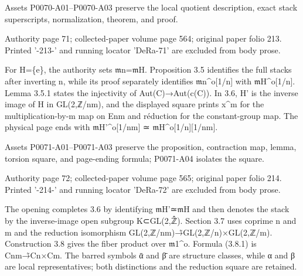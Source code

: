 \documentclass[11pt,a4paper]{article}
\begin{document}
Assets P0070-A01--P0070-A03 preserve the local quotient description, exact stack superscripts, normalization, theorem, and proof.


\par\medskip
\hypertarget{D018-P0071}{}
\par\smallskip
Authority page 71; collected-paper volume page 564; original paper folio 213. Printed '-213-' and running locator 'DeRa-71' are excluded from body prose.

For H=\{e\}, the authority sets \ensuremath{\mathfrak{m}}\textunderscore{}n=\ensuremath{\mathfrak{m}}\textunderscore{}H. Proposition 3.5 identifies the full stacks after inverting n, while its proof separately identifies \ensuremath{\mathfrak{m}}\textunderscore{}n\textasciicircum{}o[1/n] with \ensuremath{\mathfrak{m}}\textunderscore{}H\textasciicircum{}o[1/n]. Lemma 3.5.1 states the injectivity of Aut(C)→Aut(c(C)). In 3.6, H' is the inverse image of H in GL(2,ℤ/nm), and the displayed square prints x\textasciicircum{}m for the multiplication-by-m map on E\textunderscore{}nm and réduction for the constant-group map. The physical page ends with \ensuremath{\mathfrak{m}}\textunderscore{}H'\textasciicircum{}o[1/nm] ≃ \ensuremath{\mathfrak{m}}\textunderscore{}H\textasciicircum{}o[1/n][1/nm].

Assets P0071-A01--P0071-A03 preserve the proposition, contraction map, lemma, torsion square, and page-ending formula; P0071-A04 isolates the square.


\par\medskip
\hypertarget{D018-P0072}{}
\par\smallskip
Authority page 72; collected-paper volume page 565; original paper folio 214. Printed '-214-' and running locator 'DeRa-72' are excluded from body prose.

The opening completes 3.6 by identifying \ensuremath{\mathfrak{m}}\textunderscore{}H'≃\ensuremath{\mathfrak{m}}\textunderscore{}H and then denotes the stack by the inverse-image open subgroup K⊂GL(2,ℤ̂). Section 3.7 uses coprime n and m and the reduction isomorphism GL(2,ℤ/nm)→̃GL(2,ℤ/n)×GL(2,ℤ/m). Construction 3.8 gives the fiber product over \ensuremath{\mathfrak{m}}\textunderscore{}1\textasciicircum{}o. Formula (3.8.1) is C\textunderscore{}nm→̃C\textunderscore{}n×C\textunderscore{}m. The barred symbols ᾱ and β̄ are structure classes, while α and β are local representatives; both distinctions and the reduction square are retained.
\end{document}

